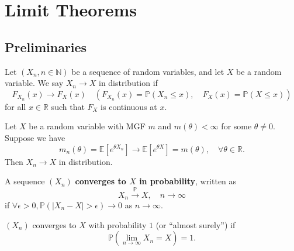 \section{Limit Theorems}
\subsection{Preliminaries}
\begin{definition}
    Let $(X_n,n\in\mathbb N)$ be a sequence of random variables, and let $X$ be a random variable. We say $X_n\to X$ in distribution if
    $$F_{X_n}(x)\to F_X(x)\quad (F_{X_n}(x)=\mathbb P(X_n\le x),\quad F_X(x)=\mathbb P(X\le x))$$
    for all $x\in\mathbb R$ such that $F_X$ is continuous at $x$.
\end{definition}

\begin{theorem}
    Let $X$ be a random variable with MGF $m$ and $m(\theta)<\infty$ for some $\theta\neq 0$.
    Suppose we have
    $$m_n(\theta)=\mathbb E[e^{\theta X_n}]\to \mathbb{E}[e^{\theta X}] = m(\theta),\quad\forall\theta\in\mathbb R.$$
    Then $X_n\to X$ in distribution.
\end{theorem}

\begin{definition}
    A sequence $(X_n)$ \textbf{converges to $X$ in probability}, written as
    $$X_n\xrightarrow{\mathbb P}X,\quad n \to\infty$$
    if $\forall\epsilon>0,\mathbb P(|X_n-X|>\epsilon)\to 0$ as $n\to\infty$.
\end{definition}

\begin{definition}
    $(X_n)$ converges to $X$ with probability $1$ (or ``almost surely'') if
    $$\mathbb P\left(\lim_{n\to\infty}X_n=X\right)=1.$$
\end{definition}

